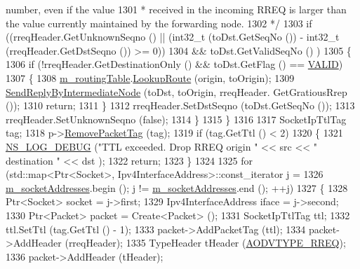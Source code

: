 \begin{DoxyCode}
{       number, even if the value}
1301 \textcolor{comment}{       * received in the incoming RREQ is larger than the value currently maintained by the forwarding
       node.}
1302 \textcolor{comment}{       */}
1303       \textcolor{keywordflow}{if} ((rreqHeader.GetUnknownSeqno () || (int32\_t (toDst.GetSeqNo ()) - int32\_t (rreqHeader.GetDstSeqno 
      ()) >= 0))
1304           && toDst.GetValidSeqNo () )
1305         \{
1306           \textcolor{keywordflow}{if} (!rreqHeader.GetDestinationOnly () && toDst.GetFlag () == \hyperlink{group__aodv_gga44216921a9c725a5ab8bc19059052a26af5fecee96bb2650aa417994840b43c99}{VALID})
1307             \{
1308               \hyperlink{classns3_1_1aodv_1_1RoutingProtocol_a4e1003a34c8adc96db71096d88c98ae0}{m\_routingTable}.\hyperlink{classns3_1_1aodv_1_1RoutingTable_a90cbc8a2c65cd68ccdaf768fcbb5d723}{LookupRoute} (origin, toOrigin);
1309               \hyperlink{classns3_1_1aodv_1_1RoutingProtocol_a862f551b61c45fb8de62bfbfa4c0a2ab}{SendReplyByIntermediateNode} (toDst, toOrigin, rreqHeader.
      GetGratiousRrep ());
1310               \textcolor{keywordflow}{return};
1311             \}
1312           rreqHeader.SetDstSeqno (toDst.GetSeqNo ());
1313           rreqHeader.SetUnknownSeqno (\textcolor{keyword}{false});
1314         \}
1315     \}
1316 
1317   SocketIpTtlTag tag;
1318   p->\hyperlink{classns3_1_1Packet_a078fe922d976a417ab25ba2f3c2fd667}{RemovePacketTag} (tag);
1319   \textcolor{keywordflow}{if} (tag.GetTtl () < 2)
1320     \{
1321       \hyperlink{group__logging_ga413f1886406d49f59a6a0a89b77b4d0a}{NS\_LOG\_DEBUG} (\textcolor{stringliteral}{"TTL exceeded. Drop RREQ origin "} << src << \textcolor{stringliteral}{" destination "} << dst );
1322       \textcolor{keywordflow}{return};
1323     \}
1324 
1325   \textcolor{keywordflow}{for} (std::map<Ptr<Socket>, Ipv4InterfaceAddress>::const\_iterator j =
1326          \hyperlink{classns3_1_1aodv_1_1RoutingProtocol_aa3263563cbbd735faafbf17fd4e28a10}{m\_socketAddresses}.begin (); j != \hyperlink{classns3_1_1aodv_1_1RoutingProtocol_aa3263563cbbd735faafbf17fd4e28a10}{m\_socketAddresses}.end (); ++j)
1327     \{
1328       Ptr<Socket> socket = j->first;
1329       Ipv4InterfaceAddress iface = j->second;
1330       Ptr<Packet> packet = Create<Packet> ();
1331       SocketIpTtlTag ttl;
1332       ttl.SetTtl (tag.GetTtl () - 1);
1333       packet->AddPacketTag (ttl);
1334       packet->AddHeader (rreqHeader);
1335       TypeHeader tHeader (\hyperlink{namespacens3_1_1aodv_a8cf417608302ba0ed75225c976944d44ad5f62dc18635d788b1a5b0dd834d46f0}{AODVTYPE\_RREQ});
1336       packet->AddHeader (tHeader);

\end{DoxyCode}
